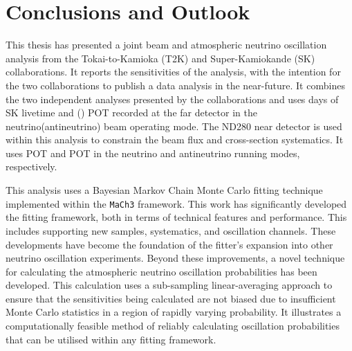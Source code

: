 \chapter{Conclusions and Outlook}

This thesis has presented a joint beam and atmospheric neutrino oscillation analysis from the Tokai-to-Kamioka (T2K) and Super-Kamiokande (SK) collaborations. It reports the sensitivities of the analysis, with the intention for the two collaborations to publish a data analysis in the near-future. It combines the two independent analyses presented by the collaborations \cite{Dunne2020-uf,Jiang2019-iw} and uses  days of SK livetime and () POT recorded at the far detector in the neutrino(antineutrino) beam operating mode. The ND280 near detector is used within this analysis to constrain the beam flux and cross-section systematics. It uses POT and POT in the neutrino and antineutrino running modes, respectively.


This analysis uses a Bayesian Markov Chain Monte Carlo fitting technique implemented within the \texttt{MaCh3} framework. This work has significantly developed the fitting framework, both in terms of technical features and performance. This includes supporting new samples, systematics, and oscillation channels. These developments have become the foundation of the fitter's expansion into other neutrino oscillation experiments. Beyond these improvements, a novel technique for calculating the atmospheric neutrino oscillation probabilities has been developed. This calculation uses a sub-sampling linear-averaging approach to ensure that the sensitivities being calculated are not biased due to insufficient Monte Carlo statistics in a region of rapidly varying probability. It illustrates a computationally feasible method of reliably calculating oscillation probabilities that can be utilised within any fitting framework.


